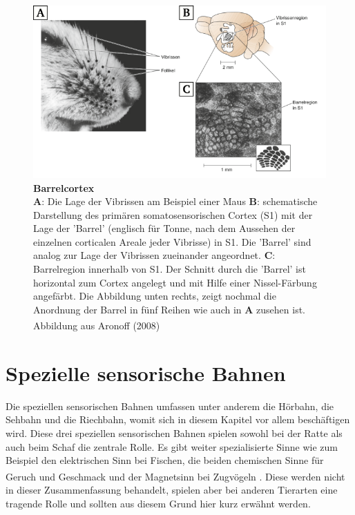 \documentclass[12pt,a4paper,pdftex]{article}
\begin{document}
\begin{figure}[H]
    \centering
    \includegraphics[width = \textwidth] {pictures/somatosensory/barrelcortex.png}
    \caption[Barrelcortex]{\textbf{Barrelcortex}\\
    \textbf{A}: Die Lage der Vibrissen am Beispiel einer Maus \textbf{B}: schematische Darstellung des primären somatosensorischen Cortex (S1) mit der Lage der 'Barrel' (englisch für Tonne, nach dem Aussehen der einzelnen corticalen Areale jeder Vibrisse) in S1. Die 'Barrel' sind analog zur Lage der Vibrissen zueinander angeordnet. \textbf{C}: Barrelregion innerhalb von S1. Der Schnitt durch die 'Barrel' ist horizontal zum Cortex angelegt und mit Hilfe einer Nissel-Färbung angefärbt. Die Abbildung unten rechts, zeigt nochmal die Anordnung der Barrel in fünf Reihen wie auch in \textbf{A} zusehen ist. Abbildung aus Aronoff (2008)
    \textsuperscript{\cite{barrelcortex2008}}}
    \label{fig:barrelcortex}
\end{figure}


\newpage
\section{Spezielle sensorische Bahnen}
\label{sec:spezsens}
Die speziellen sensorischen Bahnen umfassen unter anderem die Hörbahn, die Sehbahn  und die Riechbahn, womit sich in diesem Kapitel vor allem beschäftigen wird. Diese drei speziellen sensorischen Bahnen spielen sowohl bei der Ratte als auch beim Schaf die zentrale Rolle. Es gibt weiter spezialisierte Sinne wie zum Beispiel den elektrischen Sinn bei Fischen, die beiden chemischen Sinne für Geruch und Geschmack und der Magnetsinn bei Zugvögeln \textsuperscript{\cite{smith2008biology}}. Diese werden nicht in dieser Zusammenfassung behandelt, spielen aber bei anderen Tierarten eine tragende Rolle und sollten aus diesem Grund hier kurz erwähnt werden.
\end{document}
